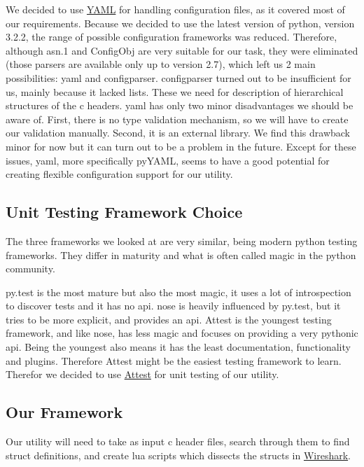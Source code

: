 We decided to use \hyperref[sec:pre:yaml]{YAML} for handling configuration
files, as it covered most of our requirements. Because we decided to use the
latest version of \Gls{python}, version 3.2.2, the range of possible configuration
frameworks was reduced. Therefore, although \Gls{asn.1} and ConfigObj are very
suitable for our task, they were eliminated (those \glspl{parser} are available
only up to version 2.7), which left us 2 main possibilities: \Gls{yaml} and
configparser. configparser turned out to be insufficient for us, mainly because
it lacked lists. These we need for description of hierarchical structures of
the \Gls{c} \glspl{header}. \Gls{yaml} has only two minor disadvantages we should be aware of.
First, there is no type validation mechanism, so we will have to create our
validation manually. Second, it is an external \gls{library}. We find this drawback
minor for now but it can turn out to be a problem in the future. Except for
these issues, \Gls{yaml}, more specifically pyYAML, seems to have a good potential
for creating flexible configuration support for our \gls{utility}.

\subsection{Unit Testing Framework Choice}
\label{sec:pre:testchoice}
The three frameworks we looked at  are very similar, being modern \Gls{python}
testing frameworks. They differ in maturity and what is often called magic in
the \Gls{python} community.

py.test is the most mature but also the most magic, it uses a lot of
introspection to discover tests and it has no \Gls{api}. nose is heavily influenced
by py.test, but it tries to be more explicit, and provides an \Gls{api}. Attest is
the youngest testing framework, and like nose, has less magic and focuses on
providing a very pythonic \Gls{api}. Being the youngest also means it has the least
documentation, functionality and plugins. Therefore Attest might be the easiest
testing framework to learn. Therefor we decided to use
\hyperref[sec:pre:attest]{Attest} for unit testing of our \gls{utility}.

\subsection{Our Framework}
\label{sec:pre:framework}
Our \gls{utility} will need to take as input \Gls{c} \gls{header} files, search through them to
find \gls{struct} definitions, and create \Gls{lua} scripts which dissects the \glspl{struct} in
\hyperref[sec:pre:wireshark]{Wireshark}.

